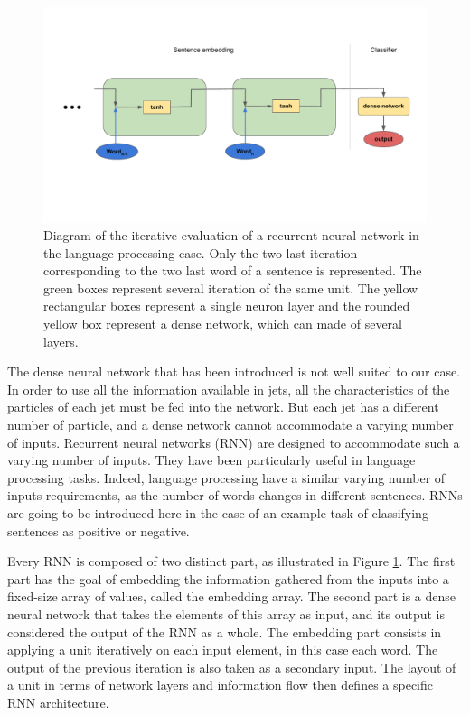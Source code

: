 \begin{figure}
    \centering
    \includegraphics[width=\textwidth]{Images/Schema_RNN.pdf}
    \caption{Diagram of the iterative evaluation of a recurrent neural network in the language processing case. Only the two last iteration corresponding to the two last word of a sentence is represented. The green boxes represent several iteration of the same unit. The yellow rectangular boxes represent a single neuron layer and the rounded yellow box represent a dense network, which can made of several layers.}
    \label{fig:recurrent_network}
\end{figure}

The dense neural network that has been introduced is not well suited to our case. In order to use all the information available in jets, all the characteristics of the particles of each jet must be fed into the network. But each jet has a different number of particle, and a dense network cannot accommodate a varying number of inputs. Recurrent neural networks (RNN) are designed to accommodate such a varying number of inputs. They have been particularly useful in language processing tasks. Indeed, language processing have a similar varying number of inputs requirements, as the number of words changes in different sentences. RNNs are going to be introduced here in the case of an example task of classifying sentences as positive or negative.

Every RNN is composed of two distinct part, as illustrated in Figure \ref{fig:recurrent_network}. The first part has the goal of embedding the information gathered from the inputs into a fixed-size array of values, called the embedding array. The second part is a dense neural network that takes the elements of this array as input, and its output is considered the output of the RNN as a whole. The embedding part consists in applying a unit iteratively on each input element, in this case each word. The output of the previous iteration is also taken as a secondary input. The layout of a unit in terms of network layers and information flow then defines a specific RNN architecture.

